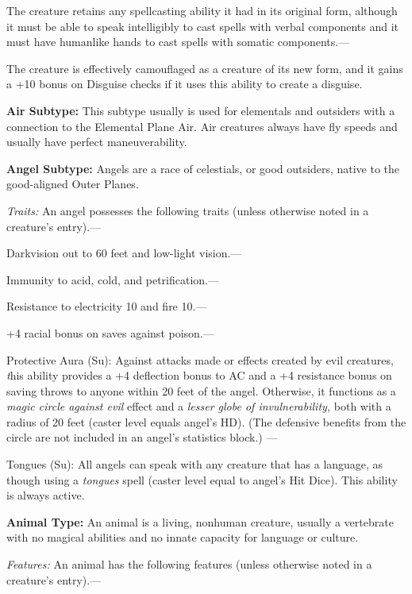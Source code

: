 \documentclass{article}
\begin{document}
The creature retains any spellcasting ability it had in its original form, although 
it must be able to speak intelligibly to cast spells with verbal components and 
it must have humanlike hands to cast spells with somatic components.---

The creature is effectively camouflaged as a creature of its new form, and it gains 
a +10 bonus on Disguise checks if it uses this ability to create a disguise.

\vspace{12pt}
\textbf{Air Subtype:} This subtype usually is used for elementals and outsiders 
with a connection to the Elemental Plane Air. Air creatures always have fly speeds 
and usually have perfect maneuverability.

\vspace{12pt}
\textbf{Angel Subtype:} Angels are a race of celestials, or good outsiders, native 
to the good-aligned Outer Planes.

\textit{Traits: }An angel possesses the following traits (unless otherwise noted 
in a creature's entry).---

Darkvision out to 60 feet and low-light vision.---

Immunity to acid, cold, and petrification.---

Resistance to electricity 10 and fire 10.--- 

\parindent=3pt
+4 racial bonus on saves against poison.---

\parindent=0pt
Protective Aura (Su): Against attacks made or effects created by evil creatures, 
\textit{t}his ability provides a +4 deflection bonus to AC and a +4 resistance 
bonus on saving throws to anyone within 20 feet of the angel. Otherwise, it functions 
as a \textit{magic circle against evil }effect and a \textit{lesser globe of invulnerability, 
}both with a radius of 20 feet (caster level equals angel's HD). (The defensive 
benefits from the circle are not included in an angel's statistics block.) ---

Tongues (Su): All angels can speak with any creature that has a language, as though 
using a \textit{tongues }spell (caster level equal to angel's Hit Dice). This ability 
is always active.

\vspace{12pt}
\textbf{Animal Type:} An animal is a living, nonhuman creature, usually a vertebrate 
with no magical abilities and no innate capacity for language or culture.

\textit{Features: }An animal has the following features (unless otherwise noted 
in a creature's entry).---
\end{document}
